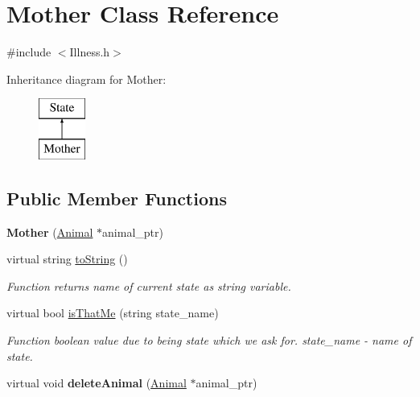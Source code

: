 \hypertarget{class_mother}{}\section{Mother Class Reference}
\label{class_mother}


{\ttfamily \#include $<$Illness.\+h$>$}

Inheritance diagram for Mother\+:\begin{figure}[H]
\begin{center}
\leavevmode
\includegraphics[height=2.000000cm]{class_mother}
\end{center}
\end{figure}
\subsection*{Public Member Functions}
\begin{DoxyCompactItemize}
\item 
\hypertarget{class_mother_a0c325979202669fa40f22b067554f92c}{}{\bfseries Mother} (\hyperlink{class_animal}{Animal} $\ast$animal\+\_\+ptr)\label{class_mother_a0c325979202669fa40f22b067554f92c}

\item 
virtual string \hyperlink{class_mother_a47c6ce820d67f3dc4d40ac39c495ef62}{to\+String} ()
\begin{DoxyCompactList}\small\item\em Function returns name of current state as string variable. \end{DoxyCompactList}\item 
virtual bool \hyperlink{class_mother_ac5a9fcd972ae6ef6fab71038d8ab3939}{is\+That\+Me} (string state\+\_\+name)
\begin{DoxyCompactList}\small\item\em Function boolean value due to being state which we ask for.  state\+\_\+name -\/ name of state. \end{DoxyCompactList}\item 
\hypertarget{class_mother_ab36cb00a4f8bfb082b7d684ed19dd5d6}{}virtual void {\bfseries delete\+Animal} (\hyperlink{class_animal}{Animal} $\ast$animal\+\_\+ptr)\label{class_mother_ab36cb00a4f8bfb082b7d684ed19dd5d6}

\end{DoxyCompactItemize}
